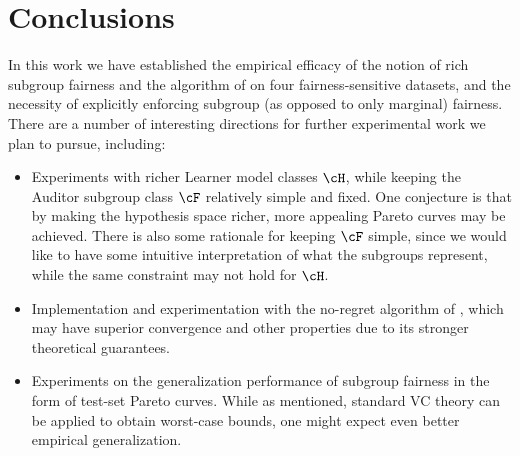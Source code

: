 \section{Conclusions}

In this work we have established the empirical efficacy of the
notion of rich subgroup fairness and the algorithm of
\cite{KNRW18} on four fairness-sensitive datasets, and the necessity of
explicitly enforcing subgroup (as opposed to only marginal) fairness.
There are
a number of interesting directions for further experimental
work we plan to pursue, including:
\begin{itemize}
\item Experiments with richer Learner model classes $\cH$, while
	keeping the Auditor subgroup class $\cF$ relatively simple
	and fixed. One conjecture is that by making the hypothesis
	space richer, more appealing Pareto curves may be achieved.
	There is also some rationale for keeping $\cF$ simple, since
	we would like to have some intuitive interpretation of what
	the subgroups represent, while the same constraint may not
	hold for $\cH$.
\item Implementation and experimentation with the no-regret algorithm
	of \cite{KNRW18}, which may have superior convergence and other
	properties due to its stronger theoretical guarantees.
\item Experiments on the generalization performance of subgroup
	fairness in the form of test-set Pareto curves. While as mentioned,
	standard VC theory can be applied to obtain worst-case bounds, one
	might expect even better empirical generalization.
\end{itemize}



